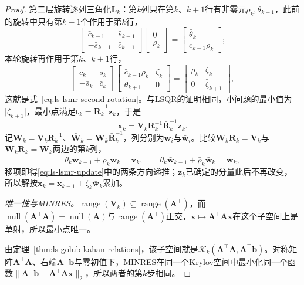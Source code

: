 \begin{proof}
第二层旋转逐列三角化$\bm L_k$：第$k$列只在第$k$、$k+1$行有非零元$\rho_k,\theta_{k+1}$，此前的旋转中只有第$k-1$个作用于第$k$行，
\[
 \begin{bmatrix}\bar c_{k-1}&\bar s_{k-1}\\-\bar s_{k-1}&\bar c_{k-1}\end{bmatrix}
 \begin{bmatrix}0\\\rho_k\end{bmatrix}
 =\begin{bmatrix}\bar\theta_k\\\bar c_{k-1}\rho_k\end{bmatrix};
\]
本轮旋转再作用于第$k$、$k+1$行，
\[
 \begin{bmatrix}\bar c_k&\bar s_k\\-\bar s_k&\bar c_k\end{bmatrix}
 \begin{bmatrix}\bar c_{k-1}\rho_k&\bar\zeta_k\\\theta_{k+1}&0\end{bmatrix}
 =\begin{bmatrix}\bar\rho_k&\zeta_k\\0&\bar\zeta_{k+1}\end{bmatrix},
\]
这就是式~\eqref{eq:ls-lsmr-second-rotation}。与LSQR的证明相同，小问题的最小值为$\lvert\bar\zeta_{k+1}\rvert$，最小点满足$\bm t_k=\bar{\bm R}_k^{-1}\bm z_k$，于是
\[
 \bm x_k=\bm V_k\bm R_k^{-1}\bar{\bm R}_k^{-1}\bm z_k .
\]
记$\bm W_k=\bm V_k\bm R_k^{-1}$、$\bar{\bm W}_k=\bm W_k\bar{\bm R}_k^{-1}$，列分别为$\bm w_i$与$\bar{\bm w}_i$。比较$\bm W_k\bm R_k=\bm V_k$与$\bar{\bm W}_k\bar{\bm R}_k=\bm W_k$两边的第$k$列，
\[
 \theta_k\bm w_{k-1}+\rho_k\bm w_k=\bm v_k,\qquad
 \bar\theta_k\bar{\bm w}_{k-1}+\bar\rho_k\bar{\bm w}_k=\bm w_k ,
\]
移项即得\eqref{eq:ls-lsmr-update}中的两条方向递推；$\bm z_k$已确定的分量此后不再改变，所以解按$\bm x_k=\bm x_{k-1}+\zeta_k\bar{\bm w}_k$累加。

\emph{唯一性与MINRES。}$\operatorname{range}(\bm V_k)\subseteq\operatorname{range}(\bm A^\top)$，而$\operatorname{null}(\bm A^\top\bm A)=\operatorname{null}(\bm A)$与$\operatorname{range}(\bm A^\top)$正交，$\bm x\mapsto\bm A^\top\bm A\bm x$在这个子空间上是单射，所以最小点唯一。

由定理~\ref{thm:ls-golub-kahan-relations}，该子空间就是$\mathcal K_k(\bm A^\top\bm A,\bm A^\top\bm b)$。对称矩阵$\bm A^\top\bm A$、右端$\bm A^\top\bm b$与零初值下，MINRES在同一个Krylov空间中最小化同一个函数$\lVert\bm A^\top\bm b-\bm A^\top\bm A\bm x\rVert_2$，所以两者的第$k$步相同。
\end{proof}

